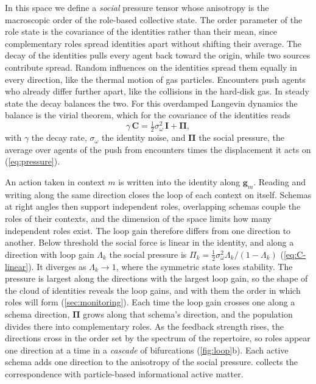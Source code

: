 \documentclass[
  aps,prx,
  reprint,
  superscriptaddress,
  nofootinbib,
  longbibliography
]{revtex4-2}
\newcommand{\g}{\mathbf{g}}
\newcommand{\C}{\mathbf{C}}
\newcommand{\Id}{\mathbf{I}}
\newcommand{\sidn}{\sigma_{\omega}}
\begin{document}
In this space we define a \textit{social} pressure tensor whose anisotropy is the macroscopic order of the role-based collective state. The order parameter of the role state is the covariance of the identities rather than their mean, since complementary roles spread identities apart without shifting their average. The decay of the identities pulls every agent back toward the origin, while two sources contribute spread. Random influences on the identities spread them equally in every direction, like the thermal motion of gas particles. Encounters push agents who already differ further apart, like the collisions in the hard-disk gas. In steady state the decay balances the two. For this overdamped Langevin dynamics the balance is the virial theorem, which for the covariance of the identities reads
\begin{equation*}
\gamma\,\C=\tfrac12\sidn^2\,\Id+\bm{\Pi},
\end{equation*}
with $\gamma$ the decay rate, $\sidn$ the identity noise, and $\bm{\Pi}$ the social pressure, the average over agents of the push from encounters times the displacement it acts on (\cref{eq:pressure}).

An action taken in context $m$ is written into the identity along $\g_m$. Reading and writing along the same direction closes the loop of each context on itself. Schemas at right angles then support independent roles, overlapping schemas couple the roles of their contexts, and the dimension of the space limits how many independent roles exist. The loop gain therefore differs from one direction to another. Below threshold the social force is linear in the identity, and along a direction with loop gain $\Lambda_k$ the social pressure is $\Pi_k=\tfrac12\sidn^2\Lambda_k/(1-\Lambda_k)$ (\cref{eq:C-linear}). It diverges as $\Lambda_k\to1$, where the symmetric state loses stability. The pressure is largest along the directions with the largest loop gain, so the shape of the cloud of identities reveals the loop gains, and with them the order in which roles will form (\cref{sec:monitoring}). Each time the loop gain crosses one along a schema direction, $\bm{\Pi}$ grows along that schema's direction, and the population divides there into complementary roles. As the feedback strength rises, the directions cross in the order set by the spectrum of the repertoire, so roles appear one direction at a time in a \emph{cascade} of bifurcations (\cref{fig:loop}b). Each active schema adds one direction to the anisotropy of the social pressure.  collects the correspondence with particle-based informational active matter.
\end{document}
